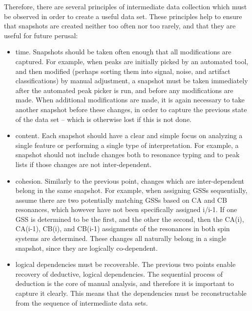 Therefore, there are several principles of intermediate data collection which
must be observed in order to create a useful data set.  These principles help
to ensure that snapshots are created neither too often nor too rarely, and
that they are useful for future perusal:
\begin{itemize}
  \item time.
    Snapshots should be taken often enough that all modifications are captured.
    For example, when peaks are initially picked by an automated tool, and then 
    modified (perhaps sorting them into signal, noise, and artifact classifications)
    by manual adjustment, a snapshot must be taken immediately after the automated
    peak picker is run, and before any modifications are made.  When additional
    modifications are made, it is again necessary to take another snapshot before
    these changes, in order to capture the previous state of the data set -- which
    is otherwise lost if this is not done.
  \item content.
    Each snapshot should have a clear and simple focus on analyzing a single
    feature or performing a single type of interpretation.  For example, a snapshot
    should not include changes both to resonance typing and to peak lists if those
    changes are not inter-dependent.  %
  \item cohesion.
    Similarly to the previous point, changes which are inter-dependent belong in
    the same snapshot.  For example, when assigning GSSs sequentially, assume there
    are two potentially matching GSSs based on CA and CB resonances, which however
    have not been specifically assigned i/i-1.  If one GSS is determined to be the
    first, and the other the second, then the CA(i), CA(i-1), CB(i), and CB(i-1)
    assignments of the resonances in both spin systems are determined.  These 
    changes all naturally belong in a single snapshot, since they are logically 
    co-dependent.
  \item logical dependencies must be recoverable.
    The previous two points enable recovery of deductive, logical dependencies.  
    The sequential process of deduction is the core of manual analysis, and 
    therefore it is important to capture it clearly.  This means that the 
    dependencies must be reconstructable from the sequence of intermediate data 
    sets.
\end{itemize}

